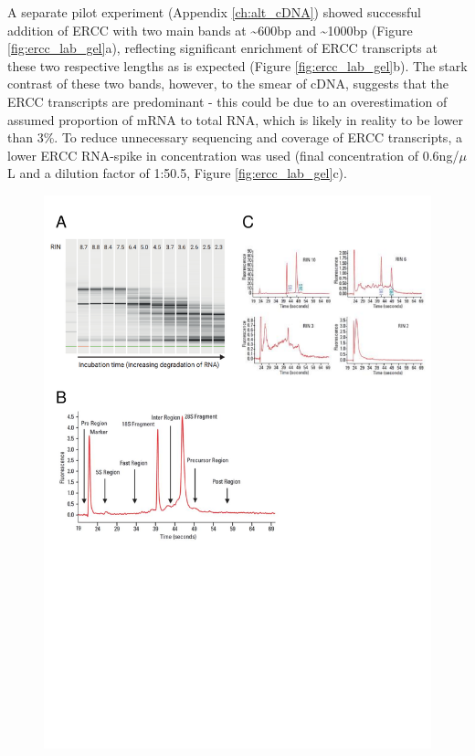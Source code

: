 A separate pilot experiment (Appendix \ref{ch:alt_cDNA}) showed successful addition of ERCC with two main bands at \textasciitilde600bp and \textasciitilde1000bp (Figure \ref{fig:ercc_lab_gel}a), reflecting significant enrichment of ERCC transcripts at these two respective lengths as is expected (Figure \ref{fig:ercc_lab_gel}b). The stark contrast of these two bands, however, to the smear of cDNA, suggests that the ERCC transcripts are predominant - this could be due to an overestimation of assumed proportion of mRNA to total RNA, which is likely in reality to be lower than 3\%. To reduce unnecessary sequencing and coverage of ERCC transcripts, a lower ERCC RNA-spike in concentration was used (final concentration of 0.6ng/$\mu$L and a dilution factor of 1:50.5, Figure \ref{fig:ercc_lab_gel}c). 

\begin{figure}[!htp]
	\begin{center}
		\includegraphics[page=4,trim={0 8cm 0 2cm},clip,scale = 0.65]{Figures/General_Methodology_Figures.pdf}

\end{center}
\end{figure}
